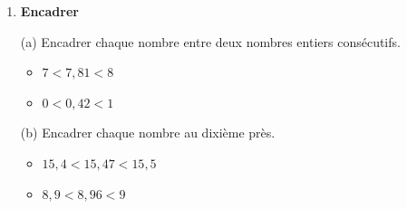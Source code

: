 \documentclass[a4paper]{book}
\begin{document}
{\begin{exercice}
\begin{enumerate}[leftmargin=*]
\begin{enumerate}[leftmargin=*]
                \medskip

                \item Ranger les nombres suivants dans l'ordre décroissant (du plus grand au plus petit) :
                \begin{center}
                    \[8,5 \quad ; \quad 8,05 \quad ; \quad 8,55 \quad ; \quad 8,055 \quad ; \quad 8,055\]
                \end{center}
                
                \begin{ZoneReponse}{2cm}

                \textcolor{red}{8,55>8,5>8,055>8,05}
                \end{ZoneReponse}
            \end{enumerate}

          
            \item \textbf{Encadrer}
    
            \medskip
                        
            \begin{minipage}{0.45\linewidth}
                (a) Encadrer chaque nombre entre deux nombres entiers consécutifs.

                \medskip
                
                \begin{itemize}
                    \item $7 < 7,81 < 8$
    
                    \bigskip
                    
                    \item $0 < 0,42 < 1$
                \end{itemize}
            \end{minipage}
            \hfill
            \begin{minipage}{0.45\linewidth}
                (b) Encadrer chaque nombre au dixième près.
                
                \medskip
                
                \begin{itemize}
                    \item $15,4 < 15,47 < 15,5$
    
                    \bigskip
                    
                    \item $8,9 < 8,96 < 9$
                \end{itemize}
    

\end{minipage}
\end{enumerate}
\end{exercice}}
\end{document}
